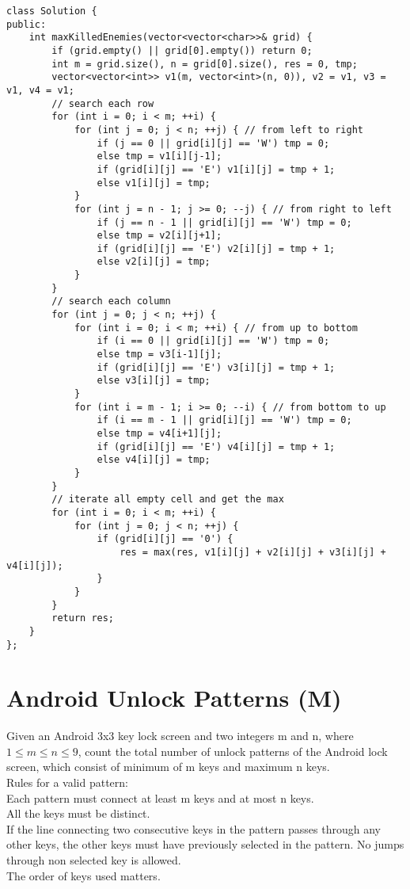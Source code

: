 \begin{lstlisting}
class Solution {
public:
    int maxKilledEnemies(vector<vector<char>>& grid) {
        if (grid.empty() || grid[0].empty()) return 0;
        int m = grid.size(), n = grid[0].size(), res = 0, tmp;
        vector<vector<int>> v1(m, vector<int>(n, 0)), v2 = v1, v3 = v1, v4 = v1;
        // search each row
        for (int i = 0; i < m; ++i) { 
            for (int j = 0; j < n; ++j) { // from left to right
                if (j == 0 || grid[i][j] == 'W') tmp = 0;
                else tmp = v1[i][j-1];
                if (grid[i][j] == 'E') v1[i][j] = tmp + 1;
                else v1[i][j] = tmp;
            }
            for (int j = n - 1; j >= 0; --j) { // from right to left
                if (j == n - 1 || grid[i][j] == 'W') tmp = 0;
                else tmp = v2[i][j+1];
                if (grid[i][j] == 'E') v2[i][j] = tmp + 1;
                else v2[i][j] = tmp;
            }
        }
        // search each column
        for (int j = 0; j < n; ++j) { 
            for (int i = 0; i < m; ++i) { // from up to bottom
                if (i == 0 || grid[i][j] == 'W') tmp = 0;
                else tmp = v3[i-1][j];
                if (grid[i][j] == 'E') v3[i][j] = tmp + 1;
                else v3[i][j] = tmp;
            }
            for (int i = m - 1; i >= 0; --i) { // from bottom to up
                if (i == m - 1 || grid[i][j] == 'W') tmp = 0;
                else tmp = v4[i+1][j];
                if (grid[i][j] == 'E') v4[i][j] = tmp + 1;
                else v4[i][j] = tmp;
            }
        }
        // iterate all empty cell and get the max 
        for (int i = 0; i < m; ++i) {
            for (int j = 0; j < n; ++j) {
                if (grid[i][j] == '0') {
                    res = max(res, v1[i][j] + v2[i][j] + v3[i][j] + v4[i][j]);
                }
            }
        }
        return res;
    }
};
\end{lstlisting}


\section{Android Unlock Patterns (M)}
Given an Android 3x3 key lock screen and two integers m and n, where $1 \leq m \leq n \leq 9$, count the total number of unlock patterns of the Android lock screen, which consist of minimum of m keys and maximum n keys.\\

Rules for a valid pattern:\\
    Each pattern must connect at least m keys and at most n keys.\\
    All the keys must be distinct.\\
    If the line connecting two consecutive keys in the pattern passes through any other keys, the other keys must have previously selected in the pattern. No jumps through non selected key is allowed.\\
    The order of keys used matters.\\

